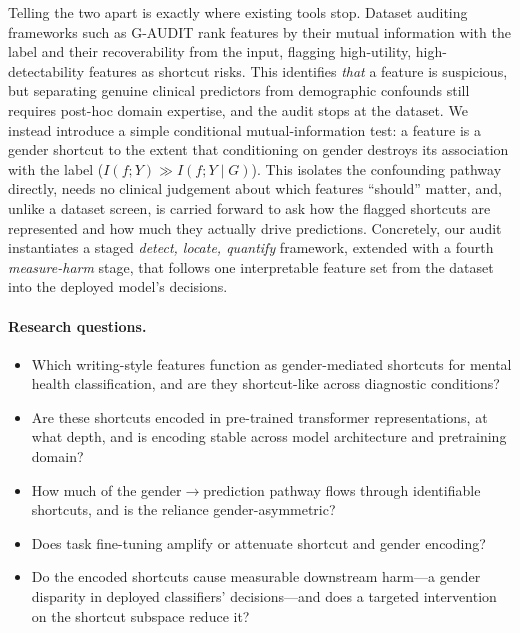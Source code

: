 \documentclass[11pt]{article}
\begin{document}
Telling the two apart is exactly where existing tools stop. Dataset auditing frameworks such as G-AUDIT \citep{drenkow2025gaudit} rank features by their mutual information with the label and their recoverability from the input, flagging high-utility, high-detectability features as shortcut risks. This identifies \emph{that} a feature is suspicious, but separating genuine clinical predictors from demographic confounds still requires post-hoc domain expertise, and the audit stops at the dataset. We instead introduce a simple conditional mutual-information test: a feature is a gender shortcut to the extent that conditioning on gender destroys its association with the label ($I(f;Y) \gg I(f;Y\mid G)$). This isolates the confounding pathway directly, needs no clinical judgement about which features ``should'' matter, and, unlike a dataset screen, is carried forward to ask how the flagged shortcuts are represented and how much they actually drive predictions. Concretely, our audit instantiates a staged \emph{detect, locate, quantify} framework, extended with a fourth \emph{measure-harm} stage, that follows one interpretable feature set from the dataset into the deployed model's decisions.

\paragraph{Research questions.}
\begin{itemize}
\setlength\itemsep{0pt}
\item[\textbf{RQ1}] Which writing-style features function as gender-mediated shortcuts for mental health classification, and are they shortcut-like across diagnostic conditions?
\item[\textbf{RQ2}] Are these shortcuts encoded in pre-trained transformer representations, at what depth, and is encoding stable across model architecture and pretraining domain?
\item[\textbf{RQ3}] How much of the gender$\to$prediction pathway flows through identifiable shortcuts, and is the reliance gender-asymmetric?
\item[\textbf{RQ4}] Does task fine-tuning amplify or attenuate shortcut and gender encoding?
\item[\textbf{RQ5}] Do the encoded shortcuts cause measurable downstream harm---a gender disparity in deployed classifiers' decisions---and does a targeted intervention on the shortcut subspace reduce it?
\end{itemize}
\end{document}

